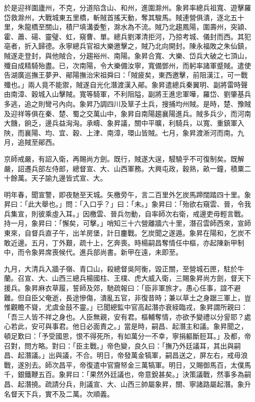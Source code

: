 \begin{pinyinscope}
於是迎祥圍廬州，不克，分道陷含山、和州，進圍滁州。象昇率總兵祖寬、遊擊羅岱救滁州，大戰城東五里橋，斬賊首搖天動，奪其駿馬。賊連營俱潰，逐北五十里，朱龍橋至關山，積尸填溝委塹，滁水為不流。賊乃北趨鳳陽，圍壽州，突潁、霍、蕭、碭、靈璧、虹，窺曹、單。總兵劉澤清拒河，乃掠考城、儀封而西。其犯亳者，折入歸德。永寧總兵官祖大樂邀擊之，賊乃北向開封。陳永福敗之朱仙鎮，賊遂走登封，與他賊合，分趨裕州、南陽。象昇合寬、大樂、岱兵大破之七頂山，殲自成精騎殆盡。已，次南陽，令大樂備汝寧，寬備鄧州，而躬率諸軍蹙賊。遣使告湖廣巡撫王夢尹、鄖陽撫治宋祖舜曰：「賊疲矣，東西邀擊，前阻漢江，可一戰殲也。」兩人竟不能禦，賊遂自光化潛渡漢入鄖。象昇遣總兵秦翼明、副將雷時聲由南漳、穀城入山擊賊。寬等騎軍，不利阻隘，副將王進忠軍嘩，羅岱、劉肇基兵多逃，追之則彎弓內向。象昇乃調四川及筸子土兵，搜捕均州賊。是時，楚、豫賊及迎祥等俱在秦、楚、蜀之交萬山中，象昇自南陽趨襄陽進兵。賊多兵少，而河南大饑，餉乏，邊兵益洶洶。承疇、象昇議，關中平曠，利騎兵，以寬、重鎮軍入陜，而襄陽、均、宜、穀、上津、南漳，環山皆賊。七月，象昇渡淅河而南。九月，追賊至鄖西。

京師戒嚴，有詔入衛，再賜尚方劍。既行，賊遂大逞，駸驍乎不可復制矣。既解嚴，詔遷兵部左侍郎，總督宣、大、山西軍務。大興屯政，穀熟，畝一鐘，積粟二十餘萬。天子諭九邊皆式宣、大。

明年春，聞宣警，即夜馳至天城。矢檄旁午，言二百里外乞炭馬蹄闊踏四十里。象昇曰：「此大舉也。」問：「入口乎？」曰：「未。」象昇曰：「殆欲右窺雲、晉，令我兵集宣，則彼乘虛入耳。」因檄雲、晉兵勿動，自率師次右衛，戒邊吏毋輕言戰。持一月，象昇曰：「懈矣，可擊。」哨知三十六營離牆六十里，潛召雲師西來，宣師東來，自督兵直子午，出羊房堡，計日鏖戰。乞炭聞之遂遁。象昇在陽和，乞炭不敢近邊。五月，丁外艱，疏十上，乞奔喪。時楊嗣昌奪情任中樞，亦起陳新甲制中，而令象昇席喪候代。進兵部尚書。新甲在遠，未即至。

九月，大清兵入牆子嶺、青口山，殺總督吳阿衡，毀正關，至營城石匣，駐於牛蘭。召宣、大、山西三總兵楊國柱、王樸、虎大威入衛，三賜象昇尚方劍，督天下援兵。象昇麻衣草履，誓師及郊，馳疏報曰：「臣非軍旅才。愚心任事，誼不避難。但自臣父奄逝，長途慘傷，潰亂五官，非復昔時；兼以草土之身踞三軍上，豈惟觀瞻不聳，尤虞金鼓不靈。」已聞總監中官高起潛亦衰絰臨戎，象昇謂所親曰：「吾三人皆不祥之身也。人臣無親，安有君。樞輔奪情，亦欲予變禮以分諐耶？處心若此，安可與事君。他日必面責之。」當是時，嗣昌、起潛主和議。象昇聞之，頓足歎曰：「予受國恩，恨不得死所，有如萬分一不幸，寧捐軀斷脰耳。」及都，帝召對，問方略。對曰：「臣主戰。」帝色變，良久曰：「撫乃外廷議耳，其出與嗣昌、起潛議。」出與議，不合。明日，帝發萬金犒軍，嗣昌送之，屏左右，戒毋浪戰，遂別去。師次昌平，帝復遣中官齎帑金三萬犒軍。明日，又賜御馬百，太僕馬千，銀鐵鞭五百。象昇曰：「果然外廷議也，帝意銳甚矣。」決策議戰，然事多為嗣昌、起潛撓。疏請分兵，則議宣、大、山西三帥屬象昇，關、寧諸路屬起潛。象升名督天下兵，實不及二萬。次順義。


\end{pinyinscope}
